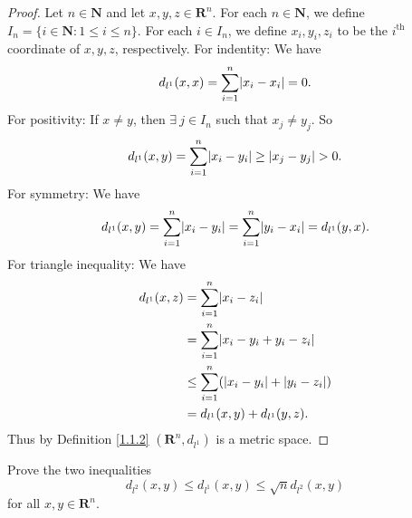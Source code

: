 \begin{proof}
    Let \(n \in \mathbf{N}\) and let \(x, y, z \in \mathbf{R}^n\).
    For each \(n \in \mathbf{N}\), we define \(I_n = \{i \in \mathbf{N} : 1 \leq i \leq n\}\).
    For each \(i \in I_n\), we define \(x_i, y_i, z_i\) to be the \(i^{\text{th}}\) coordinate of \(x, y, z\), respectively.
    For indentity:
    We have
    \[
        d_{l^1}(x, x) = \sum_{i = 1}^n \abs*{x_i - x_i} = 0.
    \]
    For positivity:
    If \(x \neq y\), then \(\exists\ j \in I_n\) such that \(x_j \neq y_j\).
    So
    \[
        d_{l^1}(x, y) = \sum_{i = 1}^n \abs*{x_i - y_i} \geq \abs*{x_j - y_j} > 0.
    \]
    For symmetry:
    We have
    \[
        d_{l^1}(x, y) = \sum_{i = 1}^n \abs*{x_i - y_i} = \sum_{i = 1}^n \abs*{y_i - x_i} = d_{l^1}(y, x).
    \]
    For triangle inequality:
    We have
    \begin{align*}
        d_{l^1}(x, z) & = \sum_{i = 1}^n \abs*{x_i - z_i}                         \\
                      & = \sum_{i = 1}^n \abs*{x_i - y_i + y_i - z_i}             \\
                      & \leq \sum_{i = 1}^n (\abs*{x_i - y_i} + \abs*{y_i - z_i}) \\
                      & = d_{l^1}(x, y) + d_{l^1}(y, z).
    \end{align*}
    Thus by Definition \ref{1.1.2} \((\mathbf{R}^n, d_{l^1})\) is a metric space.
\end{proof}

\begin{exercise}\label{ex 1.1.8}
    Prove the two inequalities
    \[
        d_{l^2}(x, y) \leq d_{l^1}(x, y) \leq \sqrt{n} d_{l^2}(x, y)
    \]
    for all \(x, y \in \mathbf{R}^n\).
\end{exercise}

